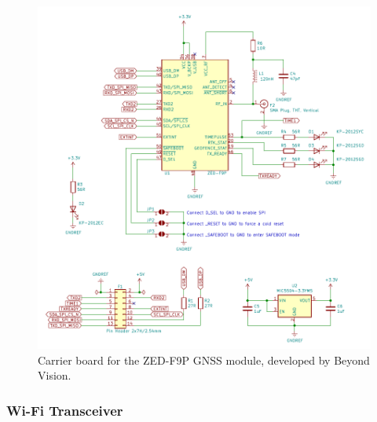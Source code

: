 \begin{figure}[h]
	\centering
	\includegraphics[width=1.0\textwidth]{Chapters/Figures/chapter3/ZED-F9P_carrier_board.pdf}
	\caption{Carrier board for the ZED-F9P GNSS module, developed by Beyond Vision.}
	\label{fig:ZED-F9P_carrier_board}
\end{figure}


\subsubsection{Wi-Fi Transceiver}\label{sec:3233_XBEE3}

